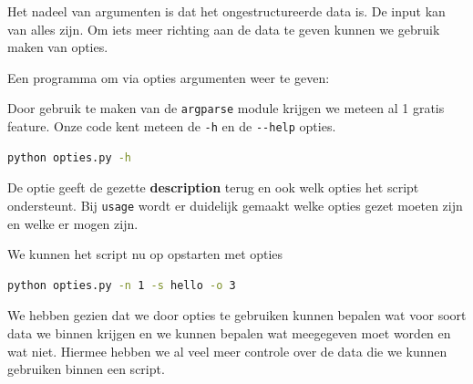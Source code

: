 Het nadeel van argumenten is dat het ongestructureerde data is. De input kan van alles zijn. Om iets meer richting aan de data te geven kunnen we gebruik maken van opties.

Een programma om via opties argumenten weer te geven:


Door gebruik te maken van de \texttt{argparse} module krijgen we meteen al 1 gratis feature. Onze code kent meteen de \texttt{-h} en de \texttt{-{}-help} opties.

\begin{lstlisting}[language=bash]
python opties.py -h
\end{lstlisting}

De optie geeft de gezette \textbf{description} terug en ook welk opties het script ondersteunt. Bij \texttt{usage} wordt er duidelijk gemaakt welke opties gezet moeten zijn en welke er mogen zijn.

We kunnen het script nu op opstarten met opties
\begin{lstlisting}[language=bash]
python opties.py -n 1 -s hello -o 3
\end{lstlisting}

We hebben gezien dat we door opties te gebruiken kunnen bepalen wat voor soort data we binnen krijgen en we kunnen bepalen wat meegegeven moet worden en wat niet. Hiermee hebben we al veel meer controle over de data die we kunnen gebruiken binnen een script.


